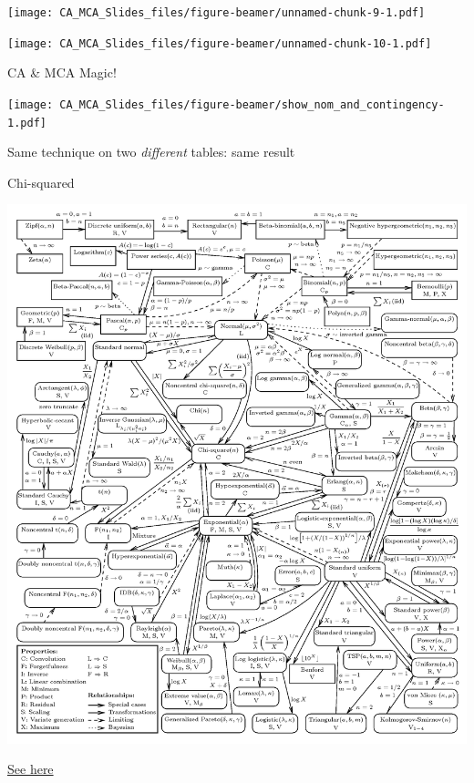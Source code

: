 \documentclass[
  ignorenonframetext,
]{beamer}
\begin{document}
\begin{frame}

\texttt{[image: CA\_MCA\_Slides\_files/figure-beamer/unnamed-chunk-9-1.pdf]}

\end{frame}

\begin{frame}

\texttt{[image: CA\_MCA\_Slides\_files/figure-beamer/unnamed-chunk-10-1.pdf]}

\end{frame}

\begin{frame}{CA \& MCA Magic!}
\protect\hypertarget{ca-mca-magic}{}

\texttt{[image: CA\_MCA\_Slides\_files/figure-beamer/show\_nom\_and\_contingency-1.pdf]}

Same technique on two \emph{different} tables: same result

\end{frame}

\begin{frame}{Chi-squared}
\protect\hypertarget{chi-squared}{}

\includegraphics{../images/distributions.png}

\href{http://www.math.wm.edu/~leemis/chart/UDR/UDR.html}{See here}

\end{frame}
\end{document}
